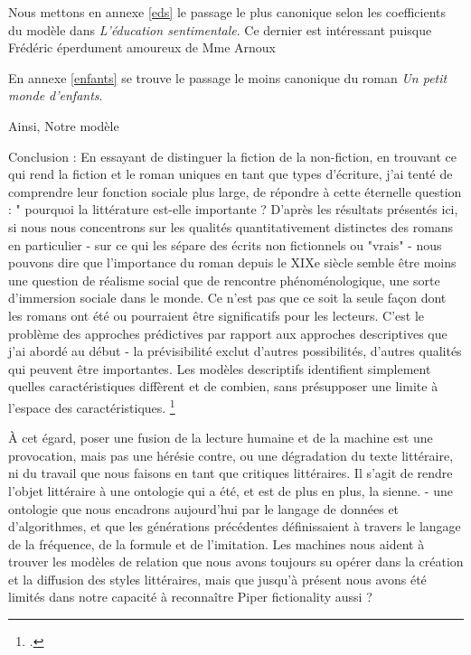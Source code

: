 Nous mettons en annexe \ref{eds} le passage le plus canonique selon les coefficients du modèle dans \textit{L'éducation sentimentale}. Ce dernier est intéressant puisque Frédéric éperdument amoureux de Mme Arnoux

En annexe \ref{enfants} se trouve le passage le moins canonique du roman \textit{Un petit monde d'enfants}. 

Ainsi, Notre modèle 




Conclusion : 
En essayant de distinguer la fiction de la non-fiction, en trouvant ce qui rend la fiction et le roman uniques en tant que types d'écriture, j'ai tenté de comprendre leur fonction sociale plus large, de répondre à cette éternelle question : " pourquoi la littérature est-elle importante ? D'après les résultats présentés ici, si nous nous concentrons sur les qualités quantitativement distinctes des romans en particulier - sur ce qui les sépare des écrits non fictionnels ou "vrais" - nous pouvons dire que l'importance du roman depuis le XIXe siècle semble être moins une question de réalisme social que de rencontre phénoménologique, une sorte d'immersion sociale dans le monde. Ce n'est pas que ce soit la seule façon dont les romans ont été ou pourraient être significatifs pour les lecteurs. C'est le problème des approches prédictives par rapport aux approches descriptives que j'ai abordé au début - la prévisibilité exclut d'autres possibilités, d'autres qualités qui peuvent être importantes. Les modèles descriptifs identifient simplement quelles caractéristiques diffèrent et de combien, sans présupposer une limite à l'espace des caractéristiques. \footcites{piper_fictionality_2016}



À cet égard, poser une fusion de la lecture humaine et de la machine est une provocation, mais pas une hérésie contre, ou une dégradation du texte littéraire, ni du travail que nous faisons en tant que critiques littéraires. Il s'agit de rendre l'objet littéraire à une ontologie qui a été, et est de plus en plus, la sienne. - une ontologie que nous encadrons aujourd'hui par le langage de données et d'algorithmes, et que les générations précédentes définissaient à travers le langage de la fréquence, de la formule et de l'imitation. Les machines nous aident à trouver les modèles de relation que nous avons toujours su opérer dans la création et la diffusion des styles littéraires, mais que jusqu'à présent nous avons été limités dans notre capacité à reconnaître Piper fictionality aussi ?



